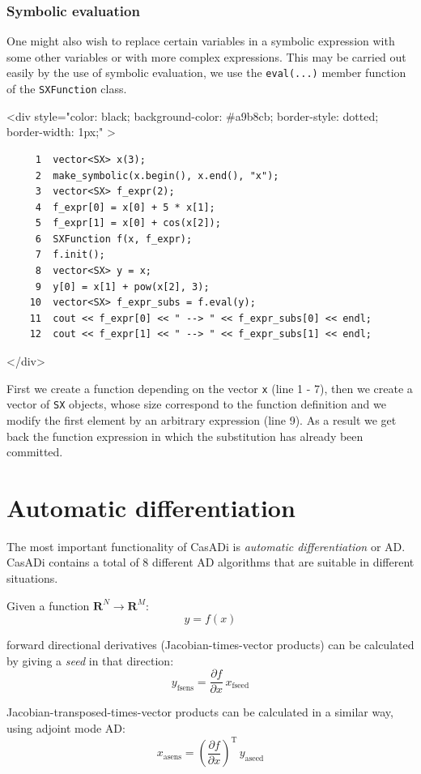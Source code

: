 \documentclass[a4paper,12pt]{book}
\newcommand{\codebegin}{
\begin{rawhtml}
<div style="color: black; background-color: \#a9b8cb;  border-style: dotted; border-width: 1px;" >
\end{rawhtml}
}
\newcommand{\codeend}{
\begin{rawhtml}
</div>
\end{rawhtml}
}
\newcommand{\codebegin}{

}
\newcommand{\codeend}{

}
\begin{document}
{ \subsection*{Symbolic evaluation}
 \par\noindent
 One might also wish to replace certain variables in a symbolic expression with some other variables
  or with more complex expressions. This may be carried out easily by the use of symbolic evaluation, we use
  the \texttt{eval(...)} member function of the \texttt{SXFunction} class.
\par
\codebegin
\begin{verbatim}
     1  vector<SX> x(3);
     2  make_symbolic(x.begin(), x.end(), "x");
     3  vector<SX> f_expr(2);
     4  f_expr[0] = x[0] + 5 * x[1];
     5  f_expr[1] = x[0] + cos(x[2]);
     6  SXFunction f(x, f_expr);
     7  f.init();
     8  vector<SX> y = x;
     9  y[0] = x[1] + pow(x[2], 3);
    10  vector<SX> f_expr_subs = f.eval(y);
    11  cout << f_expr[0] << " --> " << f_expr_subs[0] << endl;
    12  cout << f_expr[1] << " --> " << f_expr_subs[1] << endl;
\end{verbatim}
\codeend
First we create a function depending on the vector \texttt{x} (line 1 \-- 7), then we create a vector of \texttt{SX} objects, whose
size correspond to the function definition and we modify the first element by an arbitrary expression (line 9). As a result we get
back the function expression in which the substitution has already been committed.
\chapter{Automatic differentiation\label{chapter:ad}}
The most important functionality of CasADi is \emph{automatic differentiation} or AD. CasADi contains a total of 8 different AD algorithms that are suitable in different situations.

Given a function $\mathbf{R}^N \rightarrow \mathbf{R}^M$:
\begin{equation}
 y = f(x)
\end{equation}

forward directional derivatives (Jacobian-times-vector products) can be calculated by giving a \emph{seed} in that direction:
\begin{equation}
 y_{\text{fsens}} = \frac{\partial f}{\partial x} \, x_{\text{fseed}}
\end{equation}

Jacobian-transposed-times-vector products can be calculated in a similar way, using adjoint mode AD:
\begin{equation}
 x_{\text{asens}} = \left(\frac{\partial f}{\partial x}\right)^{\text{T}} \, y_{\text{aseed}}
\end{equation}

}
\end{document}
